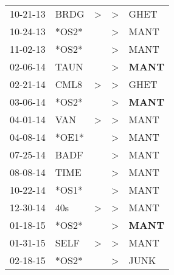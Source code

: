 \begin{supertabular}{p{0.07\textwidth}p{0.06\textwidth}p{0.02\textwidth}p{0.02\textwidth}p{0.06\textwidth}}
          10-21-13\textsuperscript{} &           BRDG\textsuperscript{} &     \textgreater &  \textgreater &           GHET\textsuperscript{} \\
          10-24-13\textsuperscript{} &                            *OS2* &                  &  \textgreater &           MANT\textsuperscript{} \\
          11-02-13\textsuperscript{} &                            *OS2* &                  &  \textgreater &           MANT\textsuperscript{} \\
          02-06-14\textsuperscript{} &           TAUN\textsuperscript{} &                  &  \textgreater &  \textbf{MANT\textsuperscript{}} \\
          02-21-14\textsuperscript{} &           CML8\textsuperscript{} &     \textgreater &  \textgreater &           GHET\textsuperscript{} \\
          03-06-14\textsuperscript{} &                            *OS2* &                  &  \textgreater &  \textbf{MANT\textsuperscript{}} \\
          04-01-14\textsuperscript{} &            VAN\textsuperscript{} &     \textgreater &  \textgreater &           MANT\textsuperscript{} \\
          04-08-14\textsuperscript{} &                            *OE1* &                  &  \textgreater &           MANT\textsuperscript{} \\
          07-25-14\textsuperscript{} &           BADF\textsuperscript{} &                  &  \textgreater &           MANT\textsuperscript{} \\
          08-08-14\textsuperscript{} &           TIME\textsuperscript{} &                  &  \textgreater &           MANT\textsuperscript{} \\
          10-22-14\textsuperscript{} &                            *OS1* &                  &  \textgreater &           MANT\textsuperscript{} \\
          12-30-14\textsuperscript{} &            40s\textsuperscript{} &     \textgreater &  \textgreater &           MANT\textsuperscript{} \\
          01-18-15\textsuperscript{} &                            *OS2* &                  &  \textgreater &  \textbf{MANT\textsuperscript{}} \\
          01-31-15\textsuperscript{} &           SELF\textsuperscript{} &     \textgreater &  \textgreater &           MANT\textsuperscript{} \\
          02-18-15\textsuperscript{} &                            *OS2* &                  &  \textgreater &           JUNK\textsuperscript{} \\

\end{supertabular}
